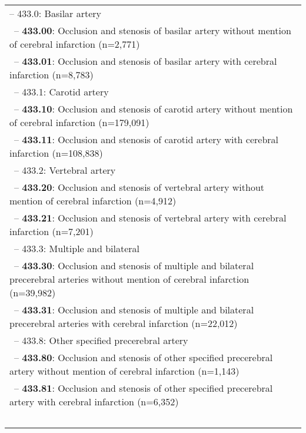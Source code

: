 \begin{longtable}{p{\textwidth}}
\hspace{30pt}\footnotesize{-- 433.0: Basilar artery} \\ \-\ \hspace{40pt}\footnotesize{-- {\color{ForestGreen} \textbf{433.00}}: Occlusion and stenosis of basilar artery without mention of cerebral infarction (n=2,771)} \\ \-\ \hspace{40pt}\footnotesize{-- {\color{ForestGreen} \textbf{433.01}}: Occlusion and stenosis of basilar artery with cerebral infarction (n=8,783)} \\ \-\ \hspace{30pt}\footnotesize{-- 433.1: Carotid artery} \\ \-\ \hspace{40pt}\footnotesize{-- {\color{ForestGreen} \textbf{433.10}}: Occlusion and stenosis of carotid artery without mention of cerebral infarction (n=179,091)} \\ \-\ \hspace{40pt}\footnotesize{-- {\color{ForestGreen} \textbf{433.11}}: Occlusion and stenosis of carotid artery with cerebral infarction (n=108,838)} \\ \-\ \hspace{30pt}\footnotesize{-- 433.2: Vertebral artery} \\ \-\ \hspace{40pt}\footnotesize{-- {\color{ForestGreen} \textbf{433.20}}: Occlusion and stenosis of vertebral artery without mention of cerebral infarction (n=4,912)} \\ \-\ \hspace{40pt}\footnotesize{-- {\color{ForestGreen} \textbf{433.21}}: Occlusion and stenosis of vertebral artery with cerebral infarction (n=7,201)} \\ \-\ \hspace{30pt}\footnotesize{-- 433.3: Multiple and bilateral} \\ \-\ \hspace{40pt}\footnotesize{-- {\color{ForestGreen} \textbf{433.30}}: Occlusion and stenosis of multiple and bilateral precerebral arteries without mention of cerebral infarction (n=39,982)} \\ \-\ \hspace{40pt}\footnotesize{-- {\color{ForestGreen} \textbf{433.31}}: Occlusion and stenosis of multiple and bilateral precerebral arteries with cerebral infarction (n=22,012)} \\ \-\ \hspace{30pt}\footnotesize{-- 433.8: Other specified precerebral artery} \\ \-\ \hspace{40pt}\footnotesize{-- {\color{ForestGreen} \textbf{433.80}}: Occlusion and stenosis of other specified precerebral artery without mention of cerebral infarction (n=1,143)} \\ \-\ \hspace{40pt}\footnotesize{-- {\color{ForestGreen} \textbf{433.81}}: Occlusion and stenosis of other specified precerebral artery with cerebral infarction (n=6,352)} \\ \-\ 
\end{longtable}
